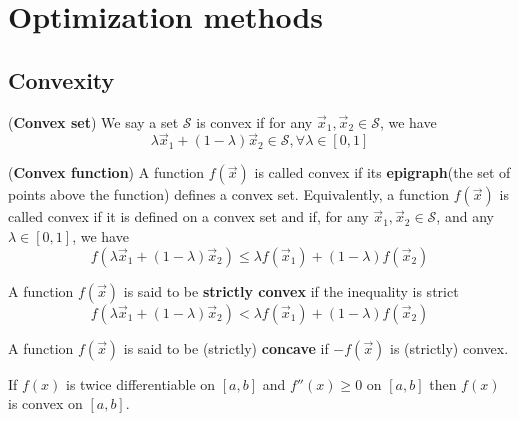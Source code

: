 \chapter{Optimization methods}
\label{chap:Optimization-methods}


\section{Convexity}
\label{sec:Convexity}

\begin{definition}
(\textbf{Convex set}) We say a set $\mathcal{S}$ is convex if for any $\vec{x}_1, \vec{x}_2 \in \mathcal{S}$, we have
\begin{equation}
\lambda\vec{x}_1+(1-\lambda)\vec{x}_2 \in \mathcal{S}, \forall \lambda \in [0,1]
\end{equation}
\end{definition}

\begin{definition}
(\textbf{Convex function}) A function $f(\vec{x})$ is called convex if its \textbf{epigraph}(the set of points above the function) defines a convex set. Equivalently, a function $f(\vec{x})$ is called convex if it is defined on a convex set and if, for any $\vec{x}_1, \vec{x}_2 \in \mathcal{S}$, and any $\lambda \in [0,1]$, we have
\begin{equation}
f(\lambda\vec{x}_1+(1-\lambda)\vec{x}_2) \leq \lambda f(\vec{x}_1)+(1-\lambda)f(\vec{x}_2)
\end{equation}
\end{definition}

\begin{definition}
A function $f(\vec{x})$ is said to be \textbf{strictly convex} if the inequality is strict
\begin{equation}
f(\lambda \vec{x}_1 + (1 - \lambda)\vec{x}_2) < \lambda f(\vec{x}_1) + (1 - \lambda)f(\vec{x}_2)
\end{equation}
\end{definition}

\begin{definition}
A function $f(\vec{x})$ is said to be (strictly) \textbf{concave} if $-f(\vec{x})$ is (strictly) convex.
\end{definition}

\begin{theorem}
If $f(x)$ is twice differentiable on $[a, b]$ and $f''(x) \geq 0$ on $[a, b]$ then $f(x)$ is convex on $[a, b]$.
\end{theorem}

